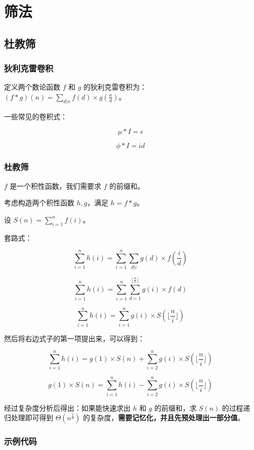 \section{筛法}

\subsection{杜教筛}

\subsubsection{狄利克雷卷积}

定义两个数论函数 $f$ 和 $g$ 的狄利克雷卷积为：$(f*g)(n)=\sum_{d|n}f(d) \times g(\frac{n}{d})$。

一些常见的卷积式：

$$\mu*I=\epsilon$$

$$\phi*I=id$$

\subsubsection{杜教筛}

$f$ 是一个积性函数，我们需要求 $f$ 的前缀和。

考虑构造两个积性函数 $h,g$，满足 $h=f*g$。

设 $S(n)=\sum_{i=1}^n f(i)$。

套路式：

$$\sum_{i=1}^n h(i)=\sum_{i=1}^n\sum_{d|i}g(d) \times f(\frac{i}{d})$$

$$\sum_{i=1}^n h(i)=\sum_{i=1}^n\sum_{d=1}^{\lfloor\frac{n}{i}\rfloor} g(i) \times f(d)$$

$$\sum_{i=1}^n h(i)=\sum_{i=1}^n g(i) \times S(\lfloor \frac{n}{i} \rfloor)$$

然后将右边式子的第一项提出来，可以得到：

$$\sum_{i=1}^n h(i)=g(1) \times S(n)+\sum_{i=2}^n g(i) \times S(\lfloor \frac{n}{i} \rfloor)$$

$$g(1) \times S(n)=\sum_{i=1}^n h(i)-\sum_{i=2}^n g(i) \times S(\lfloor \frac{n}{i} \rfloor)$$

经过复杂度分析后得出：如果能快速求出 $h$ 和 $g$ 的前缀和，求 $S(n)$ 的过程递归处理即可得到 $\Theta(n^{\frac{2}{3}})$ 的复杂度，\textbf{需要记忆化，并且先预处理出一部分值}。

\subsubsection{示例代码}

